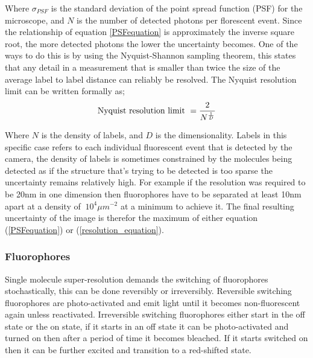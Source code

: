    Where $\sigma_{PSF}$ is the standard deviation of the point spread function (PSF)
   for the microscope, and $N$ is the number of detected photons per florescent event.
   Since the relationship of equation \ref{PSFequation} is approximately the inverse square root, 
   the more detected photons the lower the uncertainty becomes.\cite{DEMPSEY2013561}
   One of the ways to do this is by using the Nyquist-Shannon sampling theorem,
   this states that any detail in a measurement that is smaller than twice the size of the 
   average label to label distance can reliably be resolved.\cite{tinnefeld2015far}
   The Nyquist resolution limit can be written formally as; 
   \begin{equation}\label{resolution_equation}
     \textrm{Nyquist resolution limit} \/\ =\frac{2}{N^{\frac{1}{D}}}
   \end{equation}

   Where $N$ is the density of labels, and $D$ is the dimensionality. 
   Labels in this specific case refers to each individual fluorescent event that is 
   detected by the camera, the density of labels is sometimes constrained by the 
   molecules being detected as if the structure that's trying to be detected is too
   sparse the uncertainty remains relatively high. 
   For example if the resolution was required to be 20nm in 
   one dimension then fluorophores have to be separated at least 10nm apart at a density of 
   $~10^4\mu m^{-2}$ at a minimum to achieve it.
   The final resulting uncertainty of the image is therefor the maximum of either equation (\ref{PSFequation}) or (\ref{resolution_equation}). 


   \subsubsection{Fluorophores} %
   \label{ssub:Fluorophores}
   
   Single molecule super-resolution demands the switching of fluorophores
   stochastically, this can be done reversibly or irreversibly. Reversible switching fluorophores
   are photo-activated and emit light until it becomes non-fluorescent again unless reactivated.  
   Irreversible switching fluorophores either start in the off state or the on state, if it 
   starts in an off state it can be photo-activated and turned on then after a period of 
   time it becomes bleached. If it starts switched on then it can be further excited 
   and transition to a red-shifted state.\cite{van2011single}

